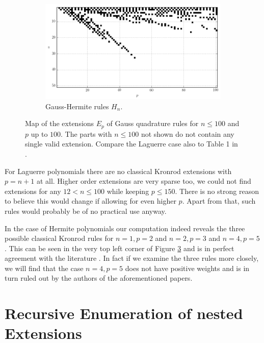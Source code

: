 \documentclass[a4paper,10pt]{article}
\begin{document}
\begin{figure}[ht!]
\begin{minipage}[t][][t]{0.49\linewidth}
\begin{subfigure}[t]{\textwidth}
    \label{fig:map_lag_20_100}
  \end{subfigure}
  \begin{subfigure}[b]{\linewidth}
    \includegraphics[width=\textwidth]{./img/map_herm_50_100.png}
    \caption{Gauss-Hermite rules $H_n$.}
    \label{fig:map_herm_50_100}
  \end{subfigure}
  \end{minipage}
  \caption{Map of the extensions $E_p$ of Gauss quadrature rules for $n \leq 100$ and $p$ up to $100$.
  The parts with $n \leq 100$ not shown do not contain any single valid extension.
  Compare the Laguerre case also to Table 1 in \cite{kahaner_waldvogel_fullerton}.}
\end{figure}

For Laguerre polynomials there are no classical Kronrod extensions with $p = n+1$
at all. Higher order extensions are very sparse too, we could not find extensions
for any $12 < n \leq 100$ while keeping $p \leq 150$. There is no strong reason to
believe this would change if allowing for even higher $p$. Apart from that, such
rules would probably be of no practical use anyway.

In the case of Hermite polynomials our computation indeed reveals the three possible
classical Kronrod rules for $n=1, p=2$ and $n = 2, p = 3$ and $n = 4, p = 5$. This
can be seen in the very top left corner of Figure \ref{fig:map_herm_50_100} and is
in perfect agreement with the literature \cite{monegato1976, kahaner-monegato, vladislav}.
In fact if we examine the three rules more closely, we will find that the case
$n = 4, p = 5$ does not have positive weights and is in turn ruled out by the
authors of the aforementioned papers.


\FloatBarrier
\section{Recursive Enumeration of nested Extensions}
\end{document}
